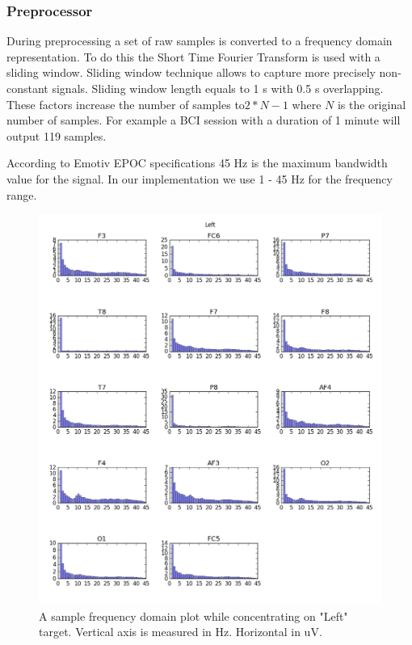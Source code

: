 \documentclass[12pt]{article}
\begin{document}
\subsubsection{Preprocessor}

During preprocessing a set of raw samples is converted to a frequency domain representation. To do this the Short Time Fourier Transform is used with a sliding window. Sliding window technique allows to capture more precisely non-constant signals. Sliding window length equals to 1 s with 0.5 s overlapping. These factors increase the number of samples to$2*N-1$ where $N$ is the original number of samples. For example a BCI session with a duration of 1 minute will output 119 samples.

According to Emotiv EPOC specifications\cite{emotiv} 45 Hz is the maximum bandwidth value for the signal. In our implementation we use 1 - 45 Hz for the frequency range.

\begin{figure} [H]
\begin{center}
\includegraphics[width=1\textwidth]{left_amplitudes}
\caption{A sample frequency domain plot while concentrating on "Left" target. Vertical axis is measured in Hz. Horizontal in uV.}
\end{center}
\end{figure}
\end{document}
